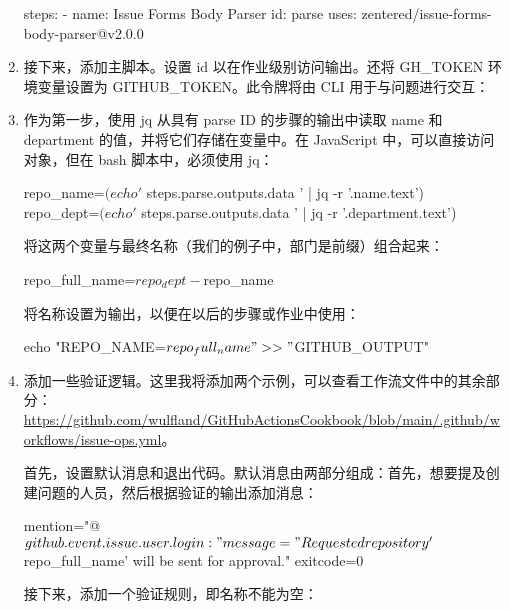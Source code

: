 \begin{enumerate}
\begin{shell}
steps:
  - name: Issue Forms Body Parser
    id: parse
    uses: zentered/issue-forms-body-parser@v2.0.0
\end{shell}

\item 
接下来，添加主脚本。设置 id 以在作业级别访问输出。还将 GH\_TOKEN 环境变量设置为 GITHUB\_TOKEN。此令牌将由 CLI 用于与问题进行交互：


\item 
作为第一步，使用 jq 从具有 parse ID 的步骤的输出中读取 name 和 department 的值，并将它们存储在变量中。在 JavaScript 中，可以直接访问对象，但在 bash 脚本中，必须使用 jq：

\begin{shell}
repo_name=$(echo '${{ steps.parse.outputs.data }}' | jq -r '.name.text')
repo_dept=$(echo '${{ steps.parse.outputs.data }}' | jq -r '.department.text')
\end{shell}

将这两个变量与最终名称（我们的例子中，部门是前缀）组合起来：

\begin{shell}
repo_full_name=$repo_dept-$repo_name
\end{shell}

将名称设置为输出，以便在以后的步骤或作业中使用：

\begin{shell}
echo "REPO_NAME=$repo_full_name" >> "$GITHUB_OUTPUT"
\end{shell}

\item 
添加一些验证逻辑。这里我将添加两个示例，可以查看工作流文件中的其余部分：\url{https://github.com/wulfland/GitHubActionsCookbook/blob/main/.github/workflows/issue-ops.yml}。

首先，设置默认消息和退出代码。默认消息由两部分组成：首先，想要提及创建问题的人员，然后根据验证的输出添加消息：

\begin{shell}
mention="@${{ github.event.issue.user.login }}: "
message="Requested repository '$repo_full_name' will be sent for approval."
exitcode=0
\end{shell}

接下来，添加一个验证规则，即名称不能为空：


\end{enumerate}
